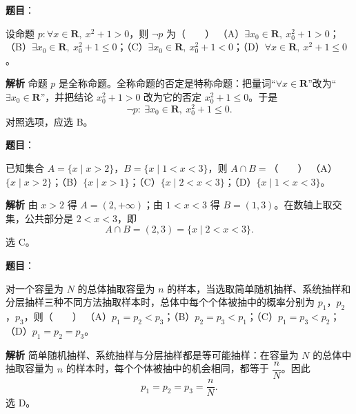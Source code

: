 
\begin{answer}

\textbf{题目}：

设命题 $p:\forall x\in\mathbf R,\ x^2+1>0$，则 $\neg p$ 为\mbox{（　　）}
（A）$\exists x_0\in\mathbf R,\ x_0^2+1>0$；（B）$\exists x_0\in\mathbf R,\ x_0^2+1\leqslant0$；（C）$\exists x_0\in\mathbf R,\ x_0^2+1<0$；（D）$\forall x\in\mathbf R,\ x^2+1\leqslant0$。

\textbf{解析}
命题 $p$ 是全称命题。全称命题的否定是特称命题：把量词“$\forall x\in\mathbf R$”改为“$\exists x_0\in\mathbf R$”，并把结论 $x_0^2+1>0$ 改为它的否定 $x_0^2+1\leqslant0$。于是
\nopagebreak[4]
\[\neg p:\ \exists x_0\in\mathbf R,\ x_0^2+1\leqslant0 .\]
对照选项，应选 B。


\end{answer}
\begin{answer}

\textbf{题目}：

已知集合 $A=\{x\mid x>2\}$，$B=\{x\mid1<x<3\}$，则 $A\cap B=$\mbox{（　　）}
（A）$\{x\mid x>2\}$；（B）$\{x\mid x>1\}$；（C）$\{x\mid2<x<3\}$；（D）$\{x\mid1<x<3\}$。

\textbf{解析}
由 $x>2$ 得 $A=(2,+\infty)$；由 $1<x<3$ 得 $B=(1,3)$。在数轴上取交集，公共部分是 $2<x<3$，即
\nopagebreak[4]
\[A\cap B=(2,3)=\{x\mid2<x<3\}.\]
选 C。


\end{answer}
\begin{answer}

\textbf{题目}：

对一个容量为 $N$ 的总体抽取容量为 $n$ 的样本，当选取简单随机抽样、系统抽样和分层抽样三种不同方法抽取样本时，总体中每个个体被抽中的概率分别为 $p_1$，$p_2$，$p_3$，则\mbox{（　　）}
（A）$p_1=p_2<p_3$；（B）$p_2=p_3<p_1$；（C）$p_1=p_3<p_2$；（D）$p_1=p_2=p_3$。

\textbf{解析}
简单随机抽样、系统抽样与分层抽样都是等可能抽样：在容量为 $N$ 的总体中抽取容量为 $n$ 的样本时，每个个体被抽中的机会相同，都等于 $\dfrac nN$。因此
\nopagebreak[4]
\[p_1=p_2=p_3=\frac nN .\]
选 D。


\end{answer}
